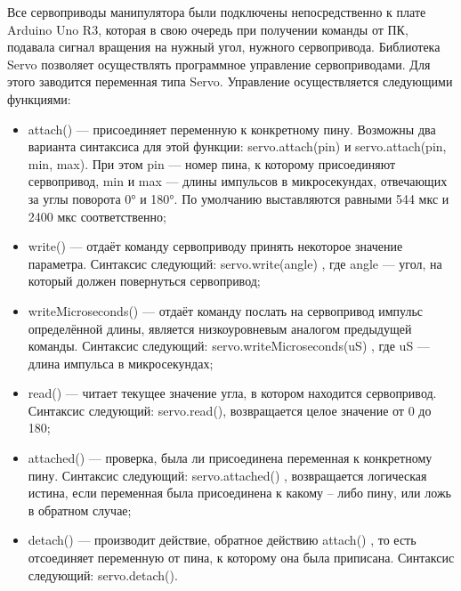 Все сервоприводы манипулятора были подключены непосредственно к плате Arduino Uno R3, которая в свою очередь при получении команды от ПК, подавала сигнал вращения на нужный угол, нужного сервопривода.
Библиотека Servo позволяет осуществлять программное управление сервоприводами. Для этого заводится переменная типа Servo. Управление осуществляется следующими функциями:
\begin{itemize}
  \item attach() — присоединяет переменную к конкретному пину. Возможны два варианта синтаксиса для этой функции: servo.attach(pin) и servo.attach(pin, min, max). При  этом pin — номер пина, к которому присоединяют сервопривод, min и max — длины импульсов в микросекундах, отвечающих за углы поворота 0° и 180°. По умолчанию выставляются равными 544 мкс и 2400 мкс соответственно;
  \item write() — отдаёт команду сервоприводу принять некоторое значение параметра. Синтаксис следующий: servo.write(angle) , где angle — угол, на который должен повернуться сервопривод;
  \item writeMicroseconds() — отдаёт команду послать на сервопривод импульс определённой длины, является низкоуровневым аналогом предыдущей команды. Синтаксис следующий: servo.writeMicroseconds(uS) , где uS — длина импульса в микросекундах;
  \item read() — читает текущее значение угла, в котором находится сервопривод. Синтаксис следующий: servo.read(), возвращается целое значение от 0 до 180;
  \item attached() — проверка, была ли присоединена переменная к конкретному пину. Синтаксис следующий: servo.attached() , возвращается логическая истина, если переменная была присоединена к какому – либо пину, или ложь в обратном случае;
  \item detach() — производит действие, обратное действию attach() , то есть отсоединяет переменную от пина, к которому она была приписана. Синтаксис следующий: servo.detach().
\end{itemize}
 